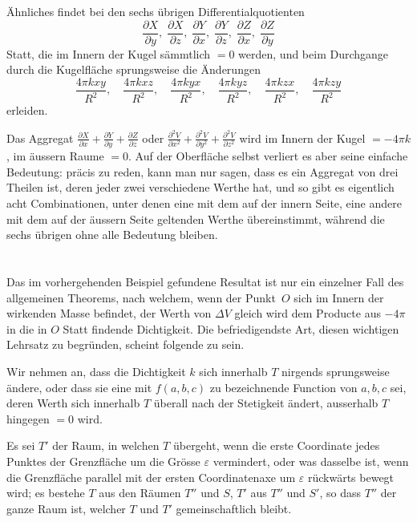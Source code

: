 \documentclass[12pt,a4paper]{article}
\begin{document}
Ähnliches findet bei den sechs übrigen Differentialquotienten
\[
\frac{\partial X}{\partial y},\; \frac{\partial X}{\partial z},\;
\frac{\partial Y}{\partial x},\; \frac{\partial Y}{\partial z},\;
\frac{\partial Z}{\partial x},\; \frac{\partial Z}{\partial y}
\]
Statt, die im Innern der Kugel sämmtlich $=0$ werden, und beim Durchgange
durch die Kugelfläche sprungsweise die Änderungen
\[
\frac{4\pi kxy}{R^2},\quad \frac{4\pi kxz}{R^2},\quad
\frac{4\pi kyx}{R^2},\quad \frac{4\pi kyz}{R^2},\quad
\frac{4\pi kzx}{R^2},\quad \frac{4\pi kzy}{R^2}
\]
erleiden.

Das Aggregat $\tfrac{\partial X}{\partial x}+\tfrac{\partial Y}{\partial y}+\tfrac{\partial Z}{\partial z}$ oder
$\tfrac{\partial^2 V}{\partial x^2}+\tfrac{\partial^2 V}{\partial y^2}+\tfrac{\partial^2 V}{\partial z^2}$ wird im Innern der
Kugel $=-4\pi k$, im äussern Raume $=0$. Auf der Oberfläche selbst verliert
es aber seine einfache Bedeutung: präcis zu reden, kann man nur sagen, dass es
ein Aggregat von drei Theilen ist, deren jeder zwei verschiedene Werthe hat,
und so gibt es eigentlich acht Combinationen, unter denen eine mit dem auf der
innern Seite, eine andere mit dem auf der äussern Seite geltenden Werthe übereinstimmt,
während die sechs übrigen ohne alle Bedeutung bleiben.

\section{}
Das im vorhergehenden Beispiel gefundene Resultat ist nur ein einzelner
Fall des allgemeinen Theorems, nach welchem, wenn der Punkt~$O$ sich im Innern
der wirkenden Masse befindet, der Werth von $\Delta V$ gleich wird dem Producte aus
$-4\pi$ in die in $O$ Statt findende Dichtigkeit. Die befriedigendste Art, diesen
wichtigen Lehrsatz zu begründen, scheint folgende zu sein.

Wir nehmen an, dass die Dichtigkeit $k$ sich innerhalb $T$ nirgends sprungsweise
ändere, oder dass sie eine mit $f(a,b,c)$ zu bezeichnende Function von
$a,b,c$ sei, deren Werth sich innerhalb $T$ überall nach der Stetigkeit ändert,
ausserhalb $T$ hingegen $=0$ wird.

Es sei $T'$ der Raum, in welchen $T$ übergeht, wenn die erste Coordinate jedes
Punktes der Grenzfläche um die Grösse $\varepsilon$ vermindert, oder was dasselbe ist,
wenn die Grenzfläche parallel mit der ersten Coordinatenaxe um $\varepsilon$ rückwärts bewegt
wird; es bestehe $T$ aus den Räumen $T''$ und $S$, $T'$ aus $T''$ und $S'$, so dass $T''$
der ganze Raum ist, welcher $T$ und $T'$ gemeinschaftlich bleibt.
\end{document}
